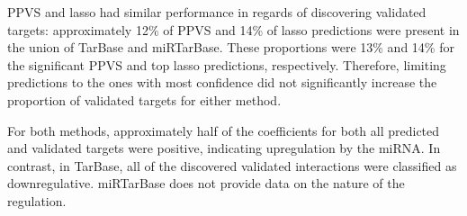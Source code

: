 PPVS and lasso had similar performance in regards of discovering validated
targets: approximately 12\% of PPVS and 14\% of lasso predictions were present
in the union of TarBase and miRTarBase. These proportions were 13\% and 14\% for
the significant PPVS and top lasso predictions, respectively. Therefore,
limiting predictions to the ones with most confidence did not significantly increase
the proportion of validated targets for either method.

For both methods, approximately half of the coefficients for both all
predicted and validated targets were positive, indicating upregulation by the
miRNA. In contrast, in TarBase, all of the discovered validated interactions
were classified as downregulative. miRTarBase does not provide data on the
nature of the regulation.
